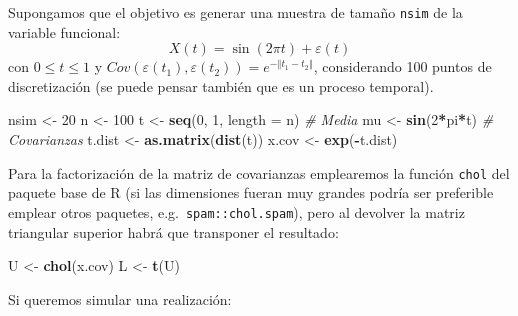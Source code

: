 \documentclass[
]{book}
\newenvironment{Shaded}{\begin{snugshade}}{\end{snugshade}}
\newcommand{\CommentTok}[1]{\textcolor[rgb]{0.56,0.35,0.01}{\textit{#1}}}
\newcommand{\DataTypeTok}[1]{\textcolor[rgb]{0.13,0.29,0.53}{#1}}
\newcommand{\DecValTok}[1]{\textcolor[rgb]{0.00,0.00,0.81}{#1}}
\newcommand{\KeywordTok}[1]{\textcolor[rgb]{0.13,0.29,0.53}{\textbf{#1}}}
\newcommand{\NormalTok}[1]{#1}
\newcommand{\OperatorTok}[1]{\textcolor[rgb]{0.81,0.36,0.00}{\textbf{#1}}}
\newcommand{\StringTok}[1]{\textcolor[rgb]{0.31,0.60,0.02}{#1}}
\theoremstyle{break}
\theoremstyle{definition}
\theoremstyle{definition}
\theoremstyle{definition}
\theoremstyle{remark}
\begin{document}
Supongamos que el objetivo es generar una muestra de tamaño \texttt{nsim} de la variable funcional:
\[X(t)=\sin\left(  2\pi t\right)  +\varepsilon\left(  t\right)\]
con \(0\leq t \leq1\) y \(Cov(\varepsilon\left( t_1 \right) , \varepsilon\left( t_2 \right) ) = e^{-\left\Vert t_1-t_2 \right\Vert }\),
considerando 100 puntos de discretización (se puede pensar también que es un proceso temporal).

\begin{Shaded}
\begin{Highlighting}[]
\NormalTok{nsim <-}\StringTok{ }\DecValTok{20}
\NormalTok{n <-}\StringTok{ }\DecValTok{100}
\NormalTok{t <-}\StringTok{ }\KeywordTok{seq}\NormalTok{(}\DecValTok{0}\NormalTok{, }\DecValTok{1}\NormalTok{, }\DataTypeTok{length =}\NormalTok{ n)}
\CommentTok{# Media}
\NormalTok{mu <-}\StringTok{ }\KeywordTok{sin}\NormalTok{(}\DecValTok{2}\OperatorTok{*}\NormalTok{pi}\OperatorTok{*}\NormalTok{t)}
\CommentTok{# Covarianzas}
\NormalTok{t.dist <-}\StringTok{ }\KeywordTok{as.matrix}\NormalTok{(}\KeywordTok{dist}\NormalTok{(t))}
\NormalTok{x.cov <-}\StringTok{ }\KeywordTok{exp}\NormalTok{(}\OperatorTok{-}\NormalTok{t.dist)}
\end{Highlighting}
\end{Shaded}

Para la factorización de la matriz de covarianzas emplearemos la función \texttt{chol}
del paquete base de R (si las dimensiones fueran muy grandes podría ser preferible emplear
otros paquetes, e.g.~\texttt{spam::chol.spam}), pero al devolver la matriz triangular superior
habrá que transponer el resultado:

\begin{Shaded}
\begin{Highlighting}[]
\NormalTok{U <-}\StringTok{ }\KeywordTok{chol}\NormalTok{(x.cov)}
\NormalTok{L <-}\StringTok{ }\KeywordTok{t}\NormalTok{(U)}
\end{Highlighting}
\end{Shaded}

Si queremos simular una realización:

\begin{Shaded}
\end{Shaded}
\end{document}
